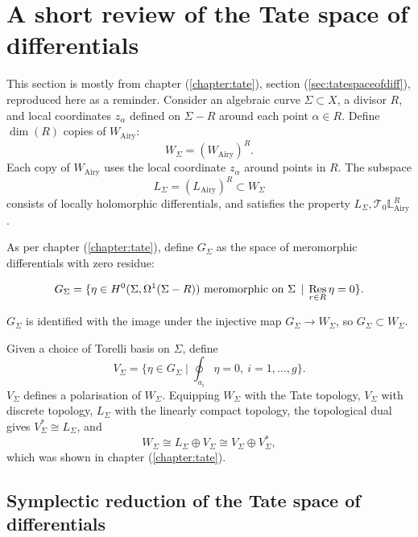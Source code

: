     
    
    
    
    \section{A short review of the Tate space of differentials}
    
    This section is mostly from chapter (\ref{chapter:tate}), section (\ref{sec:tatespaceofdiff}), reproduced here as a reminder. Consider an algebraic curve \(\Sigma \subset X\), a divisor \(R\), and local coordinates \(z_\alpha\) defined on \( \Sigma - R\) around each point \(\alpha \in R\). Define \( \dim(R)\) copies of \(W_{\mathrm{Airy}}\): 
    \[ W_\Sigma =(W_{\text{Airy}})^R.\]  
    Each copy of \(W_{\text{Airy}}\) uses the local coordinate \(z_\alpha\) around points in \(R\). The subspace 
    \[L_\Sigma =(L_{\mathrm{Airy}})^R \subset W_\Sigma \] consists of locally holomorphic differentials, and satisfies the property \( L_\Sigma, \mathcal{T}_0 \mathbb{L}^R_{\mathrm{Airy}}\). 
    
    As per chapter (\ref{chapter:tate}), define \(G_\Sigma\) as the space of meromorphic differentials with zero residue:
    \begin{defn}[\(G_\Sigma\)]
    \begin{equation} 
     \label{eqn:gsigma}
         G_\Sigma=\{ \eta\in H^0(\Sigma,\Omega^1(\Sigma-R)) \text{\ meromorphic on }\Sigma \, \mid\,\Res_{r\in R}\eta=0\}.
    \end{equation}
    \end{defn}
    \(G_\Sigma\) is identified with the image under the injective map \(G_\Sigma \rightarrow W_\Sigma\), so \(G_\Sigma \subset W_\Sigma\). 
    
    Given a choice of Torelli basis on \(\Sigma\), define
    \begin{equation} \label{vsigma}
        V_\Sigma=\{ \eta\in G_\Sigma\mid\oint_{a_i}\eta=0,\ i=1,...,g\}.
    \end{equation}
    \( V_\Sigma \) defines a polarisation of \(W_\Sigma\). Equipping \(W_\Sigma\) with the Tate topology, \(V_\Sigma\) with discrete topology, \(L_\Sigma\) with the linearly compact topology, the topological dual gives \( V_\Sigma^* \cong L_\Sigma \), and 
    \[ W_\Sigma \cong L_\Sigma \oplus V_\Sigma \cong V_\Sigma \oplus V_\Sigma^*,\] which was shown in chapter (\ref{chapter:tate}).

    \subsection{Symplectic reduction of the Tate space of differentials}

